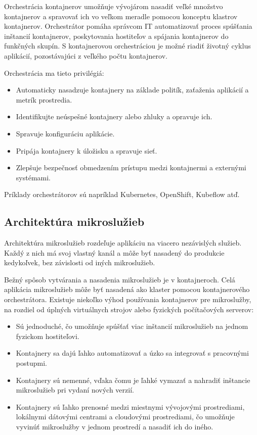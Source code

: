Orchestrácia kontajnerov umožňuje vývojárom nasadiť veľké množstvo kontajnerov a spravovať ich vo veľkom meradle pomocou konceptu klastrov kontajnerov. Orchestrátor pomáha správcom IT automatizovať proces spúšťania inštancií kontajnerov, poskytovania hostiteľov a spájania kontajnerov do funkčných skupín. S kontajnerovou orchestráciou je možné riadiť životný cyklus aplikácií, pozostávajúci z veľkého počtu kontajnerov.

Orchestrácia ma tieto privilégiá:

\begin{itemize}
	\item Automaticky nasadzuje kontajnery na základe politík, zaťaženia aplikácií a metrík prostredia.
	\item Identifikujte neúspešné kontajnery alebo zhluky a opravuje ich.
	\item Spravuje konfiguráciu aplikácie.
	\item Pripája kontajnery k úložisku a spravuje sieť.
	\item Zlepšuje bezpečnosť obmedzením prístupu medzi kontajnermi a externými systémami.
\end{itemize}

Príklady orchestrátorov sú napríklad Kubernetes, OpenShift, Kubeflow atď. 

\subsection{Architektúra mikroslužieb}

Architektúra mikroslužieb rozdeľuje aplikáciu na viacero nezávislých služieb. Každý z nich má svoj vlastný kanál a môže byť nasadený do produkcie kedykoľvek, bez závislosti od iných mikroslužieb. 

Bežný spôsob vytvárania a nasadenia mikroslužieb je v kontajneroch. Celá aplikácia mikroslužieb môže byť nasadená ako klaster pomocou kontajnerového orchestrátora. Existuje niekoľko výhod používania kontajnerov pre mikroslužby, na rozdiel od úplných virtuálnych strojov alebo fyzických počítačových serverov:

\begin{itemize}
\item Sú jednoduché, čo umožňuje spúšťať viac inštancií mikroslužieb na jednom fyzickom hostiteľovi.
\item Kontajnery sa dajú ľahko automatizovať a úzko sa integrovať s pracovnými postupmi.
\item Kontajnery sú nemenné, vďaka čomu je ľahké vymazať a nahradiť inštancie mikroslužieb pri vydaní nových verzií.
\item Kontajnery sú ľahko prenosné medzi miestnymi vývojovými prostrediami, lokálnymi dátovými centrami a cloudovými prostrediami, čo umožňuje vyvinúť mikroslužby v jednom prostredí a nasadiť ich do iného.
\end{itemize}

